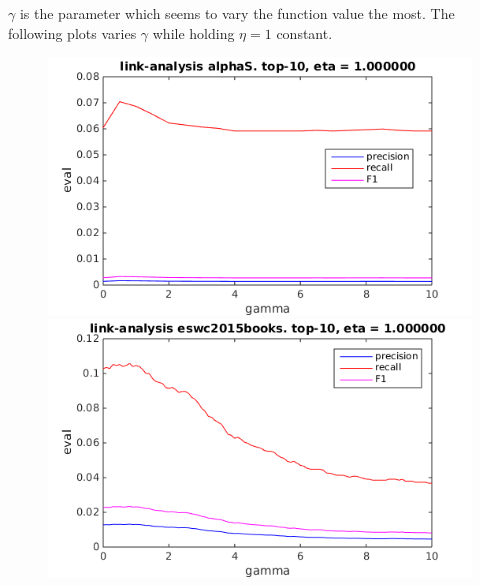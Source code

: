 \newpage

$\gamma$ is the parameter which seems to vary the function value the most. The following plots varies $\gamma$ while holding $\eta = 1$ constant.

\FloatBarrier

\begin{figure}[h!]
\centering
\begin{minipage}{.5\textwidth}
    \centering
    \includegraphics[width=\linewidth]{fig/link_gamma/alphaS_link_gamma.png}
\end{minipage}%
\begin{minipage}{.5\textwidth}
    \centering
    \includegraphics[width=\linewidth]{fig/link_gamma/eswc2015books_link_gamma.png}
\end{minipage}
\end{figure}

